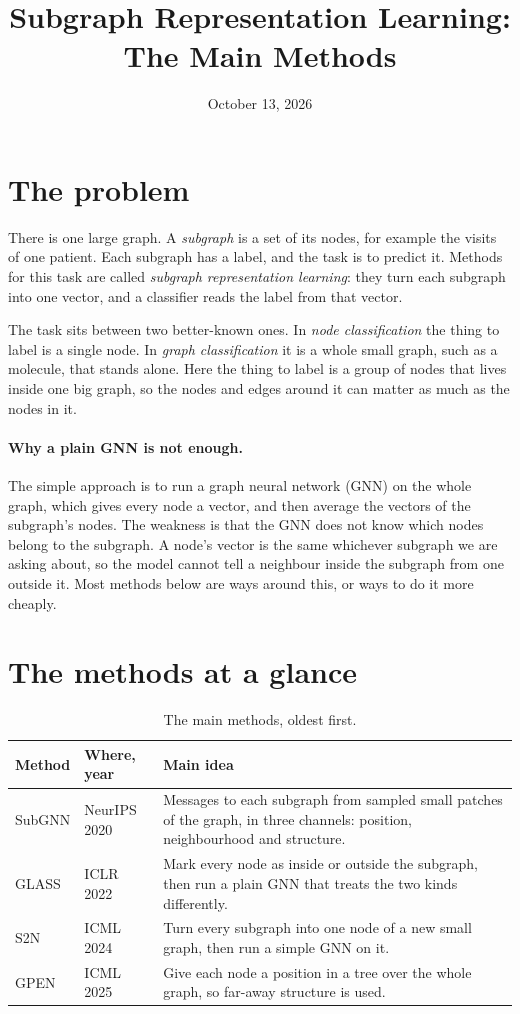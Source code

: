 \documentclass[11pt]{article}
\title{Subgraph Representation Learning:\\ The Main Methods}
\author{}
\date{October 13, 2026}
\begin{document}
\maketitle

\section*{The problem}

There is one large graph. A \emph{subgraph} is a set of its nodes, for example the visits of
one patient. Each subgraph has a label, and the task is to predict it. Methods for this task
are called \emph{subgraph representation learning}: they turn each subgraph into one vector,
and a classifier reads the label from that vector.

The task sits between two better-known ones. In \emph{node classification} the thing to label
is a single node. In \emph{graph classification} it is a whole small graph, such as a molecule,
that stands alone. Here the thing to label is a group of nodes that lives inside one big graph,
so the nodes and edges around it can matter as much as the nodes in it.

\paragraph{Why a plain GNN is not enough.} The simple approach is to run a graph neural network
(GNN) on the whole graph, which gives every node a vector, and then average the vectors of the
subgraph's nodes. The weakness is that the GNN does not know which nodes belong to the
subgraph. A node's vector is the same whichever subgraph we are asking about, so the model
cannot tell a neighbour inside the subgraph from one outside it. Most methods below are ways
around this, or ways to do it more cheaply.

\section*{The methods at a glance}

\begin{table}[H]
\centering
\small
\begin{tabularx}{\textwidth}{llX}
\toprule
Method & Where, year & Main idea \\
\midrule
SubGNN & NeurIPS 2020 & Messages to each subgraph from sampled small patches of the graph, in three channels: position, neighbourhood and structure. \\
GLASS & ICLR 2022 & Mark every node as inside or outside the subgraph, then run a plain GNN that treats the two kinds differently. \\
S2N & ICML 2024 & Turn every subgraph into one node of a new small graph, then run a simple GNN on it. \\
GPEN & ICML 2025 & Give each node a position in a tree over the whole graph, so far-away structure is used. \\
\bottomrule
\end{tabularx}
\caption{The main methods, oldest first.}
\end{table}
\end{document}
